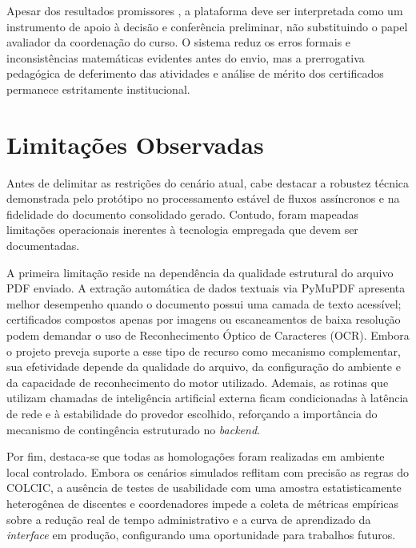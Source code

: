 
Apesar dos resultados promissores %
, a plataforma deve ser interpretada como um instrumento de apoio à decisão e conferência preliminar, não substituindo o papel avaliador da coordenação do curso. O sistema reduz os erros formais e inconsistências matemáticas evidentes antes do envio, mas a prerrogativa pedagógica de deferimento das atividades e análise de mérito dos certificados permanece estritamente institucional.

\section{Limitações Observadas}


Antes de delimitar as restrições do cenário atual, cabe destacar a robustez técnica demonstrada pelo protótipo no processamento estável de fluxos assíncronos e na fidelidade do documento consolidado gerado. Contudo, foram mapeadas limitações operacionais inerentes à tecnologia empregada que devem ser documentadas.

A primeira limitação reside na dependência da qualidade estrutural do arquivo PDF enviado. A extração automática de dados textuais via PyMuPDF\texttrademark{} apresenta melhor desempenho quando o documento possui uma camada de texto acessível; certificados compostos apenas por imagens ou escaneamentos de baixa resolução podem demandar o uso de Reconhecimento Óptico de Caracteres (OCR). Embora o projeto preveja suporte a esse tipo de recurso como mecanismo complementar, sua efetividade depende da qualidade do arquivo, da configuração do ambiente e da capacidade de reconhecimento do motor utilizado. Ademais, as rotinas que utilizam chamadas de inteligência artificial externa ficam condicionadas à latência de rede e à estabilidade do provedor escolhido, reforçando a importância do mecanismo de contingência estruturado no \textit{backend}.

Por fim, destaca-se que todas as homologações foram realizadas em ambiente local controlado. Embora os cenários simulados reflitam com precisão as regras do COLCIC, a ausência de testes de usabilidade com uma amostra estatisticamente heterogênea de discentes e coordenadores impede a coleta de métricas empíricas sobre a redução real de tempo administrativo e a curva de aprendizado da \textit{interface} em produção, configurando uma oportunidade para trabalhos futuros.
